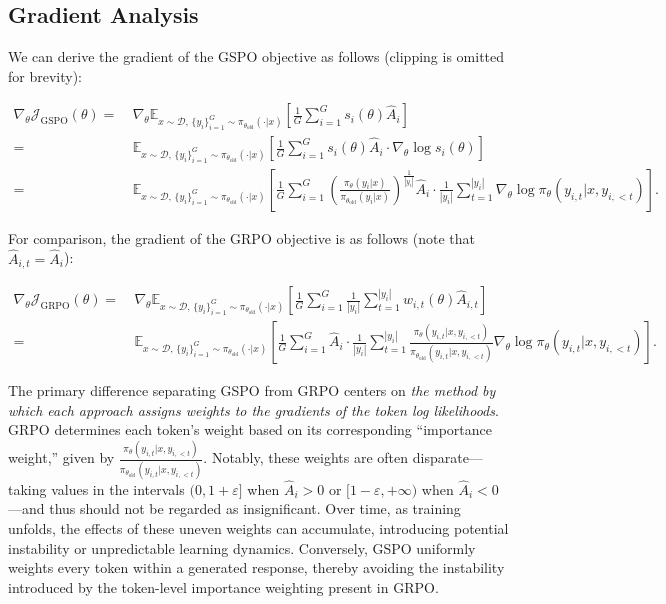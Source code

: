 \subsection{Gradient Analysis}
\label{subsec:gradient}

We can derive the gradient of the GSPO objective as follows (clipping is omitted for brevity):

\begin{align}
\nabla_{\theta} \mathcal{J}_\text{GSPO} (\theta)
=&\ 
\nabla_{\theta} \mathbb{E}_{ x \sim \mathcal{D},\, \{y_i\}_{i=1}^G \sim \pi_{\theta_\text{old}}( \cdot | x) }
\left[ 
\frac{1}{G} \sum_{i=1}^{G} s_{i}(\theta) \widehat{A}_{i}
\right] \\
= &\ 
\mathbb{E}_{ x \sim \mathcal{D},\, \{y_i\}_{i=1}^G \sim \pi_{\theta_\text{old}}( \cdot | x) }
\left[ 
\frac{1}{G} \sum_{i=1}^{G}
s_{i}(\theta) \widehat{A}_{i}
\cdot \nabla_{\theta} \log s_{i}(\theta)
\right] \\
=&\ 
\mathbb{E}_{ x \sim \mathcal{D},\, \{y_i\}_{i=1}^G \sim \pi_{\theta_\text{old}}( \cdot | x) }
\left[ 
\frac{1}{G} \sum_{i=1}^{G} 
\left( \frac{ \pi_{\theta} (y_i | x) }{ \pi_{\theta_\text{old}} (y_i | x)} \right)^{\frac{1}{|y_i|}} \widehat{A}_{i} 
\cdot \frac{1}{|y_i|} \sum_{t=1}^{|y_i|} \nabla_{\theta} \log \pi_{\theta} (y_{i,t} | x, y_{i,<t}) 
\right].
\label{equ:gspo_grad}
\end{align}

For comparison, the gradient of the GRPO objective is as follows (note that $\widehat{A}_{i,t} = \widehat{A}_{i}$):

\begin{align}
\nabla_{\theta} \mathcal{J}_\text{GRPO} (\theta) 
=&\ 
\nabla_{\theta} \mathbb{E}_{ x \sim \mathcal{D},\, \{y_i\}_{i=1}^G \sim \pi_{\theta_\text{old}}( \cdot | x) }
\left[ \frac{1}{G} \sum_{i=1}^{G} \frac{1}{|y_i|} \sum_{t=1}^{|y_i|} 
w_{i,t}(\theta) \widehat{A}_{i,t}
\right] \\
=&\
\mathbb{E}_{ x \sim \mathcal{D},\, \{y_i\}_{i=1}^G \sim \pi_{\theta_\text{old}}( \cdot | x) }
\left[ \frac{1}{G} \sum_{i=1}^{G} \widehat{A}_{i} 
\cdot \frac{1}{|y_i|} \sum_{t=1}^{|y_i|} 
\frac{ \pi_{\theta} (y_{i,t} | x, y_{i,<t}) }{ \pi_{\theta_\text{old}} (y_{i,t} | x,y_{i,<t})} 
\nabla_{\theta} \log \pi_{\theta} (y_{i,t} | x, y_{i,<t})  
\right].
\end{align}

The primary difference separating GSPO from GRPO centers on \textit{the method by which each approach assigns weights to the gradients of the token log likelihoods}. GRPO determines each token’s weight based on its corresponding ``importance weight,'' given by $\frac{ \pi_{\theta} (y_{i,t} | x, y_{i,<t}) }{ \pi_{\theta_\text{old}} (y_{i,t} | x,y_{i,<t})}$. Notably, these weights are often disparate—taking values in the intervals $(0, 1+\varepsilon]$ when $\widehat{A}_{i} > 0$ or $[1-\varepsilon, +\infty)$ when $\widehat{A}_{i} < 0$—and thus should not be regarded as insignificant. Over time, as training unfolds, the effects of these uneven weights can accumulate, introducing potential instability or unpredictable learning dynamics. Conversely, GSPO uniformly weights every token within a generated response, thereby avoiding the instability introduced by the token-level importance weighting present in GRPO.

